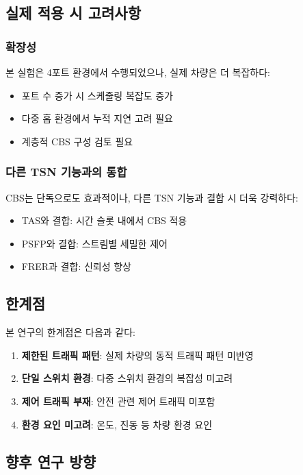 \documentclass[10pt,twocolumn]{IEEEtran}
\begin{document}
\subsection{실제 적용 시 고려사항}

\subsubsection{확장성}
본 실험은 4포트 환경에서 수행되었으나, 실제 차량은 더 복잡하다:
\begin{itemize}
\item 포트 수 증가 시 스케줄링 복잡도 증가
\item 다중 홉 환경에서 누적 지연 고려 필요
\item 계층적 CBS 구성 검토 필요
\end{itemize}

\subsubsection{다른 TSN 기능과의 통합}
CBS는 단독으로도 효과적이나, 다른 TSN 기능과 결합 시 더욱 강력하다:
\begin{itemize}
\item TAS와 결합: 시간 슬롯 내에서 CBS 적용
\item PSFP와 결합: 스트림별 세밀한 제어
\item FRER과 결합: 신뢰성 향상
\end{itemize}

\subsection{한계점}

본 연구의 한계점은 다음과 같다:

\begin{enumerate}
\item \textbf{제한된 트래픽 패턴}: 실제 차량의 동적 트래픽 패턴 미반영
\item \textbf{단일 스위치 환경}: 다중 스위치 환경의 복잡성 미고려
\item \textbf{제어 트래픽 부재}: 안전 관련 제어 트래픽 미포함
\item \textbf{환경 요인 미고려}: 온도, 진동 등 차량 환경 요인
\end{enumerate}

\subsection{향후 연구 방향}
\end{document}

